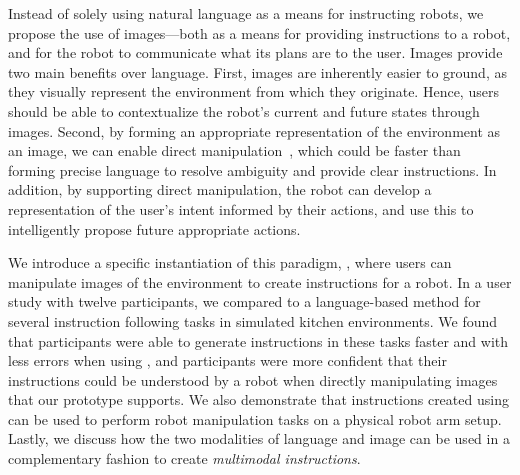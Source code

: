 Instead of solely using natural language as a means for instructing robots, we propose the use of images---both as a means for providing instructions to a robot, and for the robot to communicate what its plans are to the user. Images provide two main benefits over language. First, images are inherently easier to ground, as they visually represent the environment from which they originate. Hence, users should be able to contextualize the robot's current and future states through images. Second, by forming an appropriate representation of the environment as an image, we can enable direct manipulation~\cite{shneiderman1983direct}, which could be faster than forming precise language to resolve ambiguity and provide clear instructions. In addition, by supporting direct manipulation, the robot can develop a representation of the user's intent informed by their actions, and use this to intelligently propose future appropriate actions.


We introduce a specific instantiation of this paradigm, \projname, where users can manipulate images of the environment to create instructions for a robot. In a user study with twelve participants, we compared \projname to a language-based method for several instruction following tasks in simulated kitchen environments. We found that participants were able to generate instructions in these tasks faster and with less errors when using \projname, and participants were more confident that their instructions could be understood by a robot when directly manipulating images that our prototype supports. We also demonstrate that instructions created using \projname can be used to perform robot manipulation tasks on a physical robot arm setup. Lastly, we discuss how the two modalities of language and image can be used in a complementary fashion to create \textit{multimodal instructions}.







